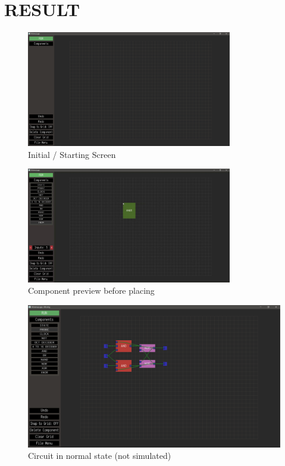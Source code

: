 \documentclass[report]{subfiles}
\begin{document}
\chapter{RESULT}
\begin{figure}[H]
    \centering
    \includegraphics[width=0.8\textwidth]{../graphics/initial_screen.png}
    \caption{Initial / Starting Screen}
\end{figure}
\begin{figure}[H]
    \centering
    \includegraphics[width=0.8\textwidth]{../graphics/preview.png}
    \caption{Component preview before placing}
\end{figure}
\begin{figure}[H]
    \centering
    \includegraphics[width=\textwidth]{../graphics/jkff_normal.png}
    \caption{Circuit in normal state (not simulated)}
\end{figure}
\end{document}
